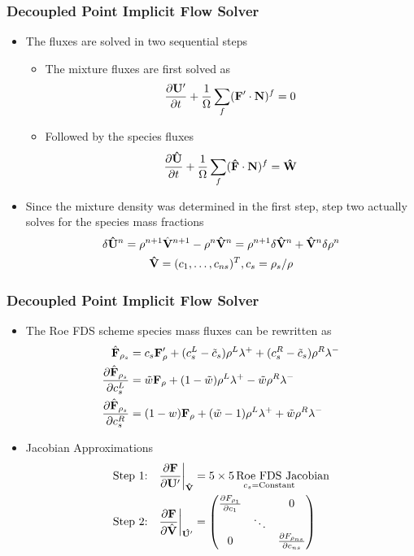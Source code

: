 \documentclass{beamer}
\begin{document}
\begin{frame}
  \frametitle{Decoupled Point Implicit Flow Solver}
  \begin{itemize}
    \item The fluxes are solved in two sequential steps
      \begin{itemize}
        \item  The mixture fluxes are first solved as
        \[
          \frac{\partial \mathbf U'}{\partial t} +
          \frac{1}{\Omega}\sum\limits_{f}(\mathbf F'\cdot\mathbf{N})^f = 0
        \]
      \item Followed by the species fluxes
      \[
        \frac{\partial \mathbf{\hat{U}}}{\partial t} +
        \frac{1}{\Omega}\sum\limits_{f}(\mathbf{\hat{F}}\cdot \mathbf{N})^f =
        \mathbf{\hat{W}}
      \]
    \end{itemize}
    \item Since the mixture density was determined in the first step, step two
      actually solves for the species mass fractions
      \begin{gather*}
        \delta \mathbf{\hat{U}}^n 
        = \rho^{n+1} \hat{\mathbf V}^{n+1}-\rho^n\mathbf{\hat{V}}^n = \rho^{n+1} \delta
        \mathbf{\hat{V}}^n + \mathbf{\hat{V}}^n \delta \rho^n \\
        \mathbf{\hat{V}}=(c_1,\hdots,c_{ns})^T, c_s=\rho_s/\rho
      \end{gather*}
  \end{itemize}
\end{frame}
\begin{frame}
  \frametitle{Decoupled Point Implicit Flow Solver}
  \begin{itemize}
    \item The Roe FDS scheme species mass fluxes can be rewritten as
      \begin{align*}
  	\hat{\mathbf F}_{\rho_s} &= c_s \mathbf F'_\rho+(c_s^L-\tilde{c}_s)\rho^L\lambda^+
  	+ (c_s^R-\tilde{c}_s)\rho^R\lambda^- \\
	\frac{\partial \hat{\mathbf F}_{\rho_s}}{\partial c_s^L} 
	&= \tilde{w} \mathbf F_\rho+(1-\tilde{w})\rho^L\lambda^+ - \tilde{w} \rho^R\lambda^- \\
	\frac{\partial \hat{\mathbf F}_{\rho_s}}{\partial c_s^R} 
	&= (1-w)\mathbf F_\rho+(\tilde{w}-1)\rho^L\lambda^+ + \tilde{w} \rho^R\lambda^- \label{d_last}
      \end{align*}
    \item Jacobian Approximations
      \begin{align*}
	\text{Step 1:}\quad &
	\frac{\partial \mathbf F}{\partial \mathbf U'}\bigg|_{\mathbf{\hat{V}}} =
	\underset{c_s = \text{Constant}}{5 \times 5\,\text{Roe FDS Jacobian}} \\
	\text{Step 2:}\quad & 
	\frac{\partial \mathbf F}{\partial \hat{\mathbf V}}\bigg|_{\mathbf{\hat{U'}}} = 
        \begin{pmatrix} 
          \frac{\partial F_{\rho_1}}{\partial c_1} & & 0
          \\ & \ddots &  \\ 0 & & \frac{\partial F_{\rho_{ns}}}{\partial c_{ns}}
        \end{pmatrix} 
      \end{align*}
  \end{itemize}
\end{frame}
\end{document}
